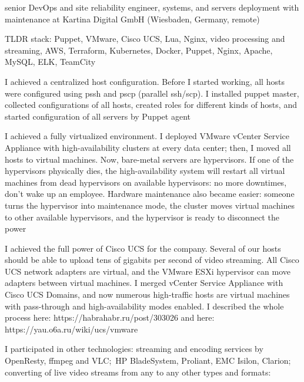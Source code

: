 {\begin{list}{●}
          \PositonTail{}
    \item {}senior DevOps and site reliability
          engineer, systems, and servers deployment with maintenance at Kartina Digital
          GmbH (Wiesbaden, Germany, remote)
          \PositonHead{}
    \item TLDR stack: Puppet, VMware, Cisco UCS, Lua, Nginx, video processing and
          streaming, AWS, Terraform, Kubernetes, Docker, Puppet, Nginx, Apache, MySQL,
          ELK, TeamCity
    \item I achieved a centralized host configuration. Before I started working,
          all hosts were configured using pssh and pscp (parallel ssh/scp). I
          installed puppet master, collected configurations of all hosts, created roles
          for different kinds of hosts, and started configuration of all servers by
          Puppet agent
    \item I achieved a fully virtualized environment. I deployed VMware vCenter Service
          Appliance with high-availability clusters at every data center; then, I moved
          all hosts to virtual machines. Now, bare-metal servers are hypervisors. If one
          of the hypervisors physically dies, the high-availability system will restart
          all virtual machines from dead hypervisors on available hypervisors: no more
          downtimes, don’t wake up an employee. Hardware maintenance also became easier:
          someone turns the hypervisor into maintenance mode, the cluster moves virtual
          machines to other available hypervisors, and the hypervisor is ready to
          disconnect the power
    \item I achieved the full power of Cisco UCS for the company. Several of our
          hosts should be able to upload tens of gigabits per second of video streaming.
          All Cisco UCS network adapters are virtual, and the VMware ESXi hypervisor can
          move adapters between virtual machines. I merged vCenter Service Appliance with
          Cisco UCS Domains, and now numerous high-traffic hosts are virtual machines
          with pass-through and high-availability modes enabled. I described the whole
          process here: https://habrahabr.ru/post/303026 and
          here: https://yau.o6a.ru/wiki/ucs/vmware
    \item I participated in other technologies: streaming and encoding services
          by OpenResty, ffmpeg and VLC;~HP BladeSystem, Proliant, EMC Isilon, Clarion;
          converting of live video streams from any to any other types and formats:

\end{list}}
